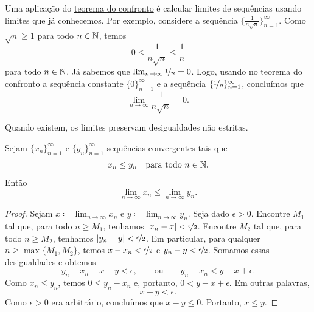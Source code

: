 \begin{myfigureht}
\caption{Demonstração do teorema do confronto em figura.\label{figsqueeze}}
\end{myfigureht}

\begin{example}
Uma aplicação do
\hyperref[squeeze:lemma]{teorema do confronto} é calcular limites de
sequências usando limites que já conhecemos. Por exemplo, considere
a sequência $\bigl\{ \frac{1}{n\sqrt{n}} \bigr\}_{n=1}^\infty$.
Como $\sqrt{n} \geq 1$ para todo $n \in {\mathbb{N}}$, temos
\begin{equation*}
0 \leq \frac{1}{n\sqrt{n}} \leq \frac{1}{n}
\end{equation*}
para todo $n \in {\mathbb{N}}$. Já sabemos que $\lim_{n\to\infty} \nicefrac{1}{n} = 0$.
Logo, usando no teorema do confronto
a sequência constante $\{ 0 \}_{n=1}^\infty$ e a sequência
$\{ \nicefrac{1}{n} \}_{n=1}^\infty$, concluímos que
\begin{equation*}
\lim_{n\to\infty} \frac{1}{n\sqrt{n}} = 0 .
\end{equation*}
\end{example}

Quando existem, os limites preservam desigualdades não estritas.

\begin{lemma} \label{limandineq:lemma}
Sejam $\{ x_n \}_{n=1}^\infty$ e $\{ y_n \}_{n=1}^\infty$
sequências convergentes tais que
\begin{equation*}
x_n \leq y_n \quad \text{para todo } n \in {\mathbb{N}} .
\end{equation*}
Então
\begin{equation*}
\lim_{n\to\infty} x_n \leq
\lim_{n\to\infty} y_n .
\end{equation*}
\end{lemma}

\begin{proof}
Sejam $x \coloneqq \lim_{n\to\infty} x_n$ e $y \coloneqq \lim_{n\to\infty} y_n$.
Seja dado $\epsilon > 0$. Encontre $M_1$ tal que, para todo $n \geq M_1$,
tenhamos $\lvert {x_n-x} \rvert < \nicefrac{\epsilon}{2}$. Encontre $M_2$ tal que,
para todo $n \geq M_2$, tenhamos
$\lvert {y_n-y} \rvert < \nicefrac{\epsilon}{2}$. Em particular,
para qualquer $n \geq \max\{ M_1, M_2 \}$, temos
$x-x_n < \nicefrac{\epsilon}{2}$ e
$y_n-y < \nicefrac{\epsilon}{2}$. Somamos essas desigualdades e
obtemos
\begin{equation*}
y_n-x_n+x-y < \epsilon, \qquad \text{ou} \qquad
y_n-x_n < y-x+ \epsilon .
\end{equation*}
Como $x_n \leq y_n$, temos
$0 \leq y_n-x_n$ e, portanto, $0 < y-x+ \epsilon$.
Em outras palavras,
\begin{equation*}
x-y < \epsilon .
\end{equation*}
Como $\epsilon > 0$ era arbitrário, concluímos que
$x-y \leq 0$.
Portanto, $x \leq y$.
\end{proof}

